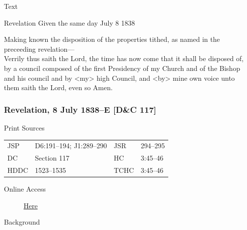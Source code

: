 				\begin{description}
					\item[Text]
				\end{description}
				
					Revelation Given the same day July 8 1838
					
					Making known the disposition of the properties tithed, as named in the preceeding revelation--- \\
					
					Verrily thus saith the Lord, the time has now come that it shall be disposed of, by a council composed of the first Presidency of my Church and of the Bishop and his council and by <my> high Council, and <by> mine own voice unto them saith the Lord, even so Amen.
		
		\subsubsection{Revelation, 8 July 1838--E [D\&C 117]}
			\label{EMS-1838-JS-8-JUL-1838-E}
			
			\begin{description}
					\item[Print Sources]
				\end{description}

					\begin{tabular}{p{0.5in}p{1in}p{0.5in}p{1in}}
					JSP	 	& D6:191--194; J1:289--290				& JSR 		& 294--295 \\
					DC	 	& Section 117		& HC 		& 3:45--46 \\
					HDDC 	& 1523--1535		& TCHC 		& 3:45--46 \\
					\end{tabular}
				
				\begin{description}
					\item[Online Access] \href{https://www.josephsmithpapers.org/paper-summary/revelation-8-july-1838-e-dc-117/1}{Here}
				\end{description}
				
				\begin{description}
					\item[Background]
				\end{description}
				
